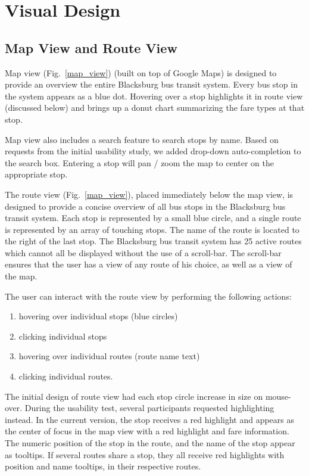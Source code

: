 \documentclass[journal]{vgtc}                %
\begin{document}
\section{Visual Design}
\subsection{Map View and Route View}

Map view (Fig.~\ref{map_view}) (built on top of Google Maps) is designed to provide an overview the entire Blacksburg bus transit system. Every bus stop in the system appears as a blue dot. Hovering over a stop highlights it in route view (discussed below) and brings up a donut chart summarizing the fare types at that stop.

Map view also includes a search feature to search stops by name. Based on requests from the initial usability study, we added drop-down auto-completion to the search box. Entering a stop will pan / zoom the map to center on the appropriate stop.

The route view (Fig.~\ref{map_view}), placed immediately below the map view, is designed to provide a concise overview of all bus stops in the Blacksburg bus transit system. Each stop is represented by a small blue circle, and a single route is represented by an array of touching stops. The name of the route is located to the right of the last stop. The Blacksburg bus transit system has 25 active routes which cannot all be displayed without the use of a scroll-bar. The scroll-bar ensures that the user has a view of any route of his choice, as well as a view of the map. 

The user can interact with the route view by performing the following actions:
\begin{enumerate}
  \item hovering over individual stops (blue circles)
  \item clicking individual stops 
  \item hovering over individual routes (route name text)
  \item clicking individual routes.
\end{enumerate}

The initial design of route view had each stop circle increase in size on mouse-over. During the usability test, several participants requested highlighting instead. In the current version, the stop receives a red highlight and appears as the center of focus in the map view with a red highlight and fare information. The numeric position of the stop in the route, and the name of the stop appear as tooltips. If several routes share a stop,  they all receive red highlights with position and name tooltips, in their respective routes. 
\end{document}
